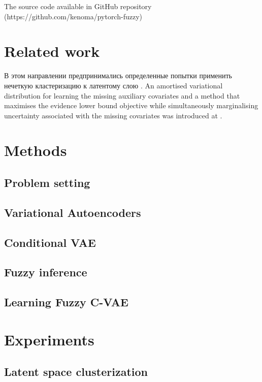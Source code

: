 \documentclass[runningheads]{llncs}
\begin{document}
The source code available in GitHub repository (https://github.com/kenoma/pytorch-fuzzy)

\section{Related work}
В этом направлении предпринимались определенные попытки применить нечеткую кластеризацию к латентому слою \cite{Bolat2020}.
An amortised variational distribution for learning the missing auxiliary covariates and a method that maximises the evidence lower bound objective while simultaneously marginalising uncertainty associated with the missing covariates was introduced at \cite{RAMCHANDRAN2024110113}. 

\section{Methods}

\subsection{Problem setting}

\subsection{Variational Autoencoders}

\subsection{Conditional VAE}

\subsection{Fuzzy inference}

\subsection{Learning Fuzzy C-VAE}


\section{Experiments}

\subsection{Latent space clusterization}
\end{document}
